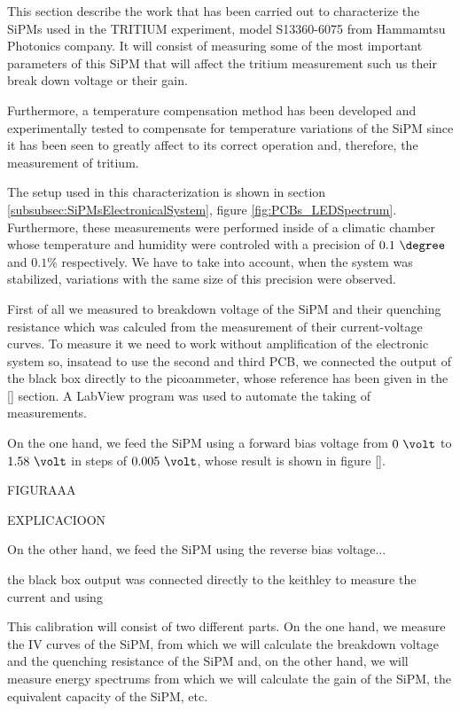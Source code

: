 This section describe the work that has been carried out to characterize the SiPMs used in the TRITIUM experiment, model S13360-6075 from Hammamtsu Photonics company. It will consist of measuring some of the most important parameters of this SiPM that will affect the tritium measurement such us their break down voltage or their gain.

Furthermore, a temperature compensation method has been developed and experimentally tested to compensate for temperature variations of the SiPM since it has been seen to greatly affect to its correct operation and, therefore, the measurement of tritium.

The setup used in this characterization is shown in section \ref{subsubsec:SiPMsElectronicalSystem}, figure \ref{fig:PCBs_LEDSpectrum}. Furthermore, these measurements were performed inside of a climatic chamber whose temperature and humidity were controled with a precision of $0.1~\degree$ and $0.1\%$ respectively. We have to take into account, when the system was stabilized, variations with the same size of this precision were observed.

First of all we measured to breakdown voltage of the SiPM and their quenching resistance which was calculed from the measurement of their current-voltage curves. To measure it we need to work without amplification of the electronic system so, insatead to use the second and third PCB, we connected the output of the black box directly to the picoammeter, whose reference has been given in the \ref{} section. A LabView program was used to automate the taking of measurements.

On the one hand, we feed the SiPM using a forward bias voltage from $0~\volt$ to $1.58~\volt$ in steps of $0.005~\volt$, whose result is shown in figure \ref{}.

FIGURAAA

EXPLICACIOON

On the other hand, we feed the SiPM using the reverse bias voltage...



the black box output was connected directly to the keithley to measure the current and using

This calibration will consist of two different parts. On the one hand, we measure the IV curves of the SiPM, from which we will calculate the breakdown voltage and the quenching resistance of the SiPM and, on the other hand, we will measure energy spectrums from which we will calculate the gain of the SiPM, the equivalent capacity of the SiPM, etc.

